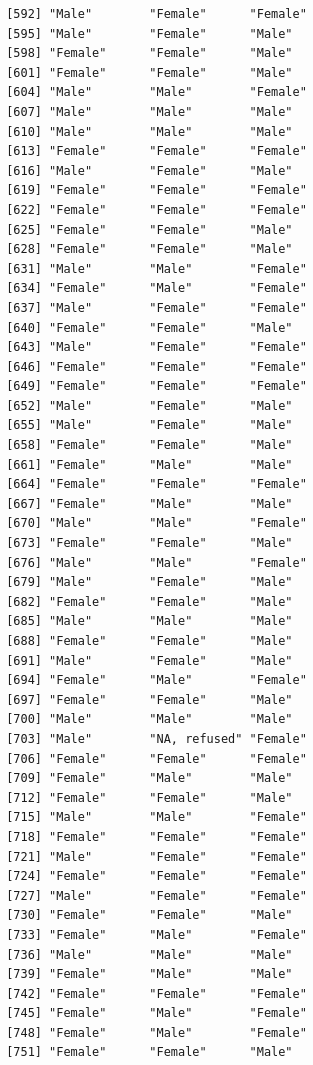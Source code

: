 \documentclass{beamer}\usepackage[]{graphicx}\usepackage[]{color}
\makeatletter
\newenvironment{kframe}{%
 \def\at@end@of@kframe{}%
 \ifinner\ifhmode%
  \def\at@end@of@kframe{\end{minipage}}%
  \begin{minipage}{\columnwidth}%
 \fi\fi%
 \def\FrameCommand##1{\hskip\@totalleftmargin \hskip-\fboxsep
 \colorbox{shadecolor}{##1}\hskip-\fboxsep
     \hskip-\linewidth \hskip-\@totalleftmargin \hskip\columnwidth}%
 \MakeFramed {\advance\hsize-\width
   \@totalleftmargin\z@ \linewidth\hsize
   \@setminipage}}%
 {\par\unskip\endMakeFramed%
 \at@end@of@kframe}
\newenvironment{knitrout}{}{} %
\makeatother
\begin{document}
\begin{frame}[fragile]
\begin{knitrout}
\begin{kframe}
\begin{verbatim}
 [592] "Male"        "Female"      "Female"     
 [595] "Male"        "Female"      "Male"       
 [598] "Female"      "Female"      "Male"       
 [601] "Female"      "Female"      "Male"       
 [604] "Male"        "Male"        "Female"     
 [607] "Male"        "Male"        "Male"       
 [610] "Male"        "Male"        "Male"       
 [613] "Female"      "Female"      "Female"     
 [616] "Male"        "Female"      "Male"       
 [619] "Female"      "Female"      "Female"     
 [622] "Female"      "Female"      "Female"     
 [625] "Female"      "Female"      "Male"       
 [628] "Female"      "Female"      "Male"       
 [631] "Male"        "Male"        "Female"     
 [634] "Female"      "Male"        "Female"     
 [637] "Male"        "Female"      "Female"     
 [640] "Female"      "Female"      "Male"       
 [643] "Male"        "Female"      "Female"     
 [646] "Female"      "Female"      "Female"     
 [649] "Female"      "Female"      "Female"     
 [652] "Male"        "Female"      "Male"       
 [655] "Male"        "Female"      "Male"       
 [658] "Female"      "Female"      "Male"       
 [661] "Female"      "Male"        "Male"       
 [664] "Female"      "Female"      "Female"     
 [667] "Female"      "Male"        "Male"       
 [670] "Male"        "Male"        "Female"     
 [673] "Female"      "Female"      "Male"       
 [676] "Male"        "Male"        "Female"     
 [679] "Male"        "Female"      "Male"       
 [682] "Female"      "Female"      "Male"       
 [685] "Male"        "Male"        "Male"       
 [688] "Female"      "Female"      "Male"       
 [691] "Male"        "Female"      "Male"       
 [694] "Female"      "Male"        "Female"     
 [697] "Female"      "Female"      "Male"       
 [700] "Male"        "Male"        "Male"       
 [703] "Male"        "NA, refused" "Female"     
 [706] "Female"      "Female"      "Female"     
 [709] "Female"      "Male"        "Male"       
 [712] "Female"      "Female"      "Male"       
 [715] "Male"        "Male"        "Female"     
 [718] "Female"      "Female"      "Female"     
 [721] "Male"        "Female"      "Female"     
 [724] "Female"      "Female"      "Female"     
 [727] "Male"        "Female"      "Female"     
 [730] "Female"      "Female"      "Male"       
 [733] "Female"      "Male"        "Female"     
 [736] "Male"        "Male"        "Male"       
 [739] "Female"      "Male"        "Male"       
 [742] "Female"      "Female"      "Female"     
 [745] "Female"      "Male"        "Female"     
 [748] "Female"      "Male"        "Female"     
 [751] "Female"      "Female"      "Male"       

\end{verbatim}
\end{kframe}
\end{knitrout}
\end{frame}
\end{document}

